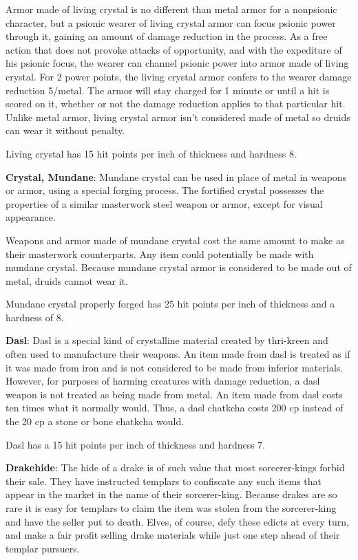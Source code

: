 Armor made of living crystal is no different than metal armor for a nonpsionic character, but a psionic wearer of living crystal armor can focus psionic power through it, gaining an amount of damage reduction in the process. As a free action that does not provoke attacks of opportunity, and with the expediture of his psionic focus, the wearer can channel psionic power into armor made of living crystal. For 2 power points, the living crystal armor confers to the wearer damage reduction 5/metal. The armor will stay charged for 1 minute or until a hit is scored on it, whether or not the damage reduction applies to that particular hit. Unlike metal armor, living crystal armor isn't considered made of metal so druids can wear it without penalty.

Living crystal has 15 hit points per inch of thickness and hardness 8.

\textbf{Crystal, Mundane}: Mundane crystal can be used in place of metal in weapons or armor, using a special forging process. The fortified crystal possesses the properties of a similar masterwork steel weapon or armor, except for visual appearance.

Weapons and armor made of mundane crystal cost the same amount to make as their masterwork counterparts. Any item could potentially be made with mundane crystal. Because mundane crystal armor is considered to be made out of metal, druids cannot wear it.

Mundane crystal properly forged has 25 hit points per inch of thickness and a hardness of 8.

\textbf{Dasl}: Dasl is a special kind of crystalline material created by thri-kreen and often used to manufacture their weapons. An item made from dasl is treated as if it was made from iron and is not considered to be made from inferior materials. However, for purposes of harming creatures with damage reduction, a dasl weapon is not treated as being made from metal. An item made from dasl costs ten times what it normally would. Thus, a dasl chatkcha costs 200 cp instead of the 20 cp a stone or bone chatkcha would.

Dasl has a 15 hit points per inch of thickness and hardness 7.

\textbf{Drakehide}: The hide of a drake is of such value that most sorcerer-kings forbid their sale. They have instructed templars to confiscate any such items that appear in the market in the name of their sorcerer-king. Because drakes are so rare it is easy for templars to claim the item was stolen from the sorcerer-king and have the seller put to death. Elves, of course, defy these edicts at every turn, and make a fair profit selling drake materials while just one step ahead of their templar pursuers.

